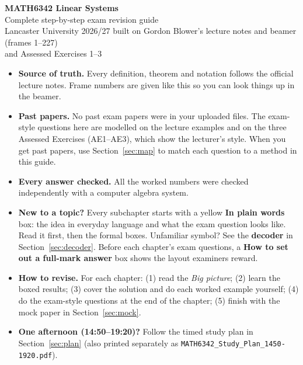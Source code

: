 \documentclass[11pt,a4paper]{article}
\begin{document}
\begin{center}
{\Huge\bfseries\color{navy}MATH6342 Linear Systems}\\[6pt]
{\Large Complete step-by-step exam revision guide}\\[6pt]
{\color{teal}Lancaster University 2026/27 \textbullet{} built on Gordon Blower's lecture notes and beamer (frames 1--227)\\
and Assessed Exercises 1--3}
\end{center}

\begin{defbox}[title={How this guide is built, and how to use it}]
\begin{itemize}
\item \textbf{Source of truth.} Every definition, theorem and notation follows the official lecture notes.
Frame numbers are given like this  so you can look things up in the beamer.
\item \textbf{Past papers.} No past exam papers were in your uploaded files. The exam-style questions here are
modelled on the lecture examples and on the three Assessed Exercises (AE1--AE3), which show the lecturer's style.
When you get past papers, use Section~\ref{sec:map} to match each question to a method in this guide.
\item \textbf{Every answer checked.} All the worked numbers were checked independently with a computer algebra system.
\item \textbf{New to a topic?} Every subchapter starts with a yellow \textbf{In plain words} box: the idea in everyday language and what the exam question looks like. Read it first, then the formal boxes. Unfamiliar symbol? See the \textbf{decoder} in Section~\ref{sec:decoder}. Before each chapter's exam questions, a \textbf{How to set out a full-mark answer} box shows the layout examiners reward.
\item \textbf{How to revise.} For each chapter: (1) read the \emph{Big picture}; (2) learn the boxed results;
(3) cover the solution and do each worked example yourself; (4) do the exam-style questions at the end of the chapter;
(5) finish with the mock paper in Section~\ref{sec:mock}.
\item \textbf{One afternoon (14:50--19:20)?} Follow the timed study plan in Section~\ref{sec:plan} (also printed separately as \texttt{MATH6342\_Study\_Plan\_1450-1920.pdf}).
\end{itemize}
\end{defbox}

\tableofcontents
\newpage










\end{document}
